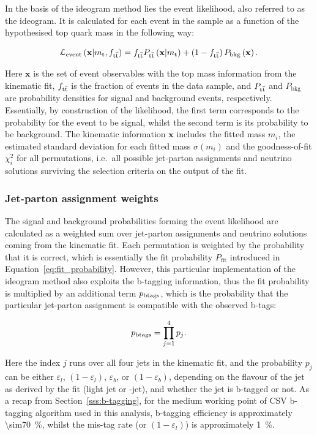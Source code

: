 In the basis of the ideogram method lies the event likelihood, also referred to as the ideogram. It is calculated for
each event in the sample as a function of the hypothesised top quark mass \mtop in the following way:

\begin{equation}
\mathcal{L}_\textrm{event} \left(\mathbf{x}|m_\mathrm{t}, f_{\mathrm{t}\overline{\mathrm{t}}} \right) = f_{\mathrm{t}\overline{\mathrm{t}}} P_{\mathrm{t}\overline{\mathrm{t}}}
\left(\mathbf{x}|m_\mathrm{t}\right) + \left(1 - f_{\mathrm{t}\overline{\mathrm{t}}} \right)P_\textrm{bkg}\left(\mathbf{x}\right).
\label{eq:event_likelihood}
\end{equation}

Here $\mathbf{x}$ is the set of event observables with the top mass information from the kinematic fit, $f_{\mathrm{t}\overline{\mathrm{t}}}$ is
the fraction of \ttbar events in the data sample, and $P_{\mathrm{t}\overline{\mathrm{t}}}$ and $P_\textrm{bkg}$ are probability densities for
signal and background events, respectively. Essentially, by construction of the likelihood, the first term corresponds
to the probability for the event to be signal, whilst the second term is its probability to be background. The kinematic
information $\mathbf{x}$ includes the fitted mass $m_{i}$, the estimated standard deviation for each fitted mass
$\sigma(m_{i})$ and the goodness-of-fit $\chi^{2}_{i}$ for all permutations, i.e.\ all possible jet-parton assignments
and neutrino solutions surviving the selection criteria on the output of the fit.

\subsubsection*{Jet-parton assignment weights}
The signal and background probabilities forming the event likelihood are calculated as a weighted sum over jet-parton
assignments and neutrino solutions coming from the kinematic fit. Each permutation is weighted by the probability that
it is correct, which is essentially the fit probability $P_{\textrm{fit}}$ introduced in
Equation~\ref{eq:fit_probability}. However, this particular implementation of the ideogram method also exploits the
b-tagging information, thus the fit probability is multiplied by an additional term $p_{\rm btags}$, which is the
probability that the particular jet-parton assignment is compatible with the observed b-tags:

\begin{equation}
p_{\rm btags} = \prod_{j=1}^{4} p_{j}.
\end{equation}

Here the index $j$ runs over all four jets in the kinematic fit, and the probability $p_{j}$ can be either
$\varepsilon_{l}$, $(1 - \varepsilon_{l})$, $\varepsilon_{b}$, or $(1 - \varepsilon_{b})$, depending on the flavour of
the jet as derived by the fit (light jet or \cPqb-jet), and whether the jet is b-tagged or not. As a recap from
Section~\ref{sss:b-tagging}, for the medium working point of CSV b-tagging algorithm used in this analysis, b-tagging
efficiency is approximately \SI{\sim70}{\percent}, whilst the mis-tag rate (or $(1 - \varepsilon_{l})$) is approximately
\SI{1}{\percent}.

